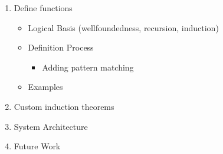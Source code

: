 \begin{slide}

\begin{enumerate}
\item Define functions
\begin{itemize}
\item Logical Basis (wellfoundedness, recursion, induction)
\item Definition Process
   \begin{itemize}
   \item Adding pattern matching
   \end{itemize}
\item Examples
\end{itemize}
\item Custom induction theorems
\item System Architecture
\item Future Work
\end{enumerate}
\end{slide} 


